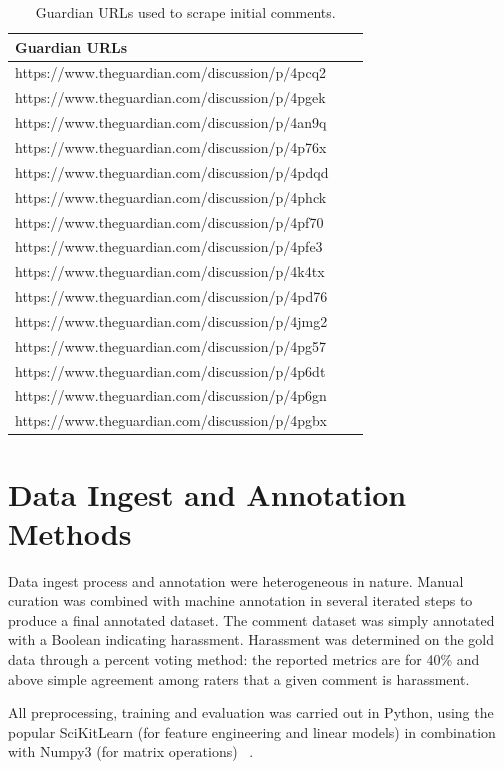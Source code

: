 \documentclass[11pt,a4paper]{article}
\begin{document}
\begin{table}[h]
\begin{center}
\begin{tabular}{|l|rl|}
\hline \bf Guardian URLs \\ \hline
https://www.theguardian.com/discussion/p/4pcq2 \\
https://www.theguardian.com/discussion/p/4pgek \\
https://www.theguardian.com/discussion/p/4an9q \\
https://www.theguardian.com/discussion/p/4p76x \\
https://www.theguardian.com/discussion/p/4pdqd \\
https://www.theguardian.com/discussion/p/4phck \\
https://www.theguardian.com/discussion/p/4pf70 \\
https://www.theguardian.com/discussion/p/4pfe3 \\
https://www.theguardian.com/discussion/p/4k4tx \\
https://www.theguardian.com/discussion/p/4pd76 \\
https://www.theguardian.com/discussion/p/4jmg2 \\
https://www.theguardian.com/discussion/p/4pg57 \\
https://www.theguardian.com/discussion/p/4p6dt \\
https://www.theguardian.com/discussion/p/4p6gn \\
https://www.theguardian.com/discussion/p/4pgbx \\
\hline
\end{tabular}
\end{center}
\caption{\label{font-table} Guardian URLs used to scrape initial comments. }
\end{table}

\section{Data Ingest and Annotation Methods}
Data ingest process and annotation were heterogeneous
in nature. Manual curation was combined
with machine annotation in several iterated steps to
produce a final annotated dataset. The comment dataset
was simply annotated with a Boolean indicating
harassment. Harassment was determined on the
gold data through a percent voting method: the reported
metrics are for 40\% and above simple agreement
among raters that a given comment is harassment.

All preprocessing, training and evaluation was
carried out in Python, using the popular SciKitLearn
(for feature engineering and linear models)
in combination with Numpy3 (for matrix operations)
~\cite{Pedregosa:2011,van_der_Walt:2011}.
\end{document}

